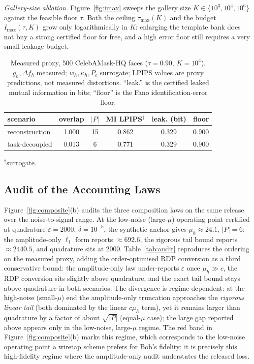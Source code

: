 \documentclass{ieeetj}
\theoremstyle{plain}
\theoremstyle{definition}
\begin{document}
\emph{Gallery-size ablation.} Figure~\ref{fig:imax} sweeps the gallery size
$K\in\{10^{3},10^{4},10^{6}\}$ against the feasible floor $\tau$. Both the
ceiling $\tau_{\max}(K)$ and the budget $I_{\max}(\tau,K)$ grow only
logarithmically in $K$: enlarging the template bank does not buy a strong
certified floor for free, and a high error floor still requires a very small
leakage budget.

\begin{table}[t]
\centering\footnotesize
\setlength{\tabcolsep}{3.5pt}
\caption{Measured proxy, 500 CelebAMask-HQ faces ($\tau{=}0.90$, $K{=}10^{4}$).
$g_h,\Delta f_h$ measured; $w_h,\kappa_h,P_e$ surrogate; LPIPS values are
proxy predictions, not measured distortions. ``leak.'' is the certified leaked
mutual information in bits; ``floor'' is the Fano identification-error floor.}
\label{tab:measured}
\begin{tabular}{lccccc}
\toprule
scenario & overlap & $|P|$ & MI LPIPS$^\dagger$ & leak. (bit) & floor \\
\midrule
reconstruction & 1.000 & 15 & 0.862 & 0.329 & 0.900 \\
task-decoupled & 0.013 & 6 & 0.771 & 0.329 & 0.900 \\
\bottomrule
\end{tabular}
$^\dagger$surrogate.
\end{table}

\subsection{Audit of the Accounting Laws}

Figure~\ref{fig:composite}(b) audits the three composition laws on the same
release over the noise-to-signal range. At the low-noise (large-$\mu$)
operating point certified at quadrature $\varepsilon=2000$, $\delta=10^{-5}$,
the synthetic anchor gives $\mu_h\approx24.1$, $|P|=6$: the amplitude-only
$\ell_1$ form reports $\approx692.6$, the rigorous tail bound reports
$\approx2440.5$, and quadrature sits at 2000. Table~\ref{tab:audit} reproduces
the ordering on the measured proxy, adding the order-optimised RDP conversion
as a third conservative bound: the amplitude-only law under-reports
$\varepsilon$ once $\mu_h\gg c$, the RDP conversion sits slightly above
quadrature, and the exact tail bound stays above quadrature in both scenarios.
The divergence is regime-dependent: at the high-noise (small-$\mu$) end the
amplitude-only truncation approaches the \emph{rigorous linear tail}
(both dominated by the linear $c\mu_h$ term), yet it remains larger than
quadrature by a factor of about $\sqrt{|P|}$ (equal-$\mu$ case); the large gap
reported above appears only in the low-noise, large-$\mu$ regime. The red band in
Figure~\ref{fig:composite}(b) marks this regime, which corresponds to the
low-noise operating point a wiretap scheme prefers for Bob's fidelity; it is
precisely this high-fidelity regime where the amplitude-only audit understates
the released loss.
\end{document}
